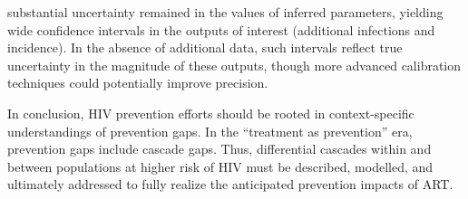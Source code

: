 substantial uncertainty remained in the values of inferred parameters,
yielding wide confidence intervals in the outputs of interest (additional infections and incidence).
In the absence of additional data,
such intervals reflect true uncertainty in the magnitude of these outputs,
though more advanced calibration techniques could potentially improve precision.
\par
In conclusion, HIV prevention efforts should be rooted in
context-specific understandings of prevention gaps.
In the ``treatment as prevention'' era, prevention gaps include cascade gaps.
Thus, differential cascades within and between populations at higher risk of HIV
must be described, modelled, and ultimately addressed
to fully realize the anticipated prevention impacts of ART.
